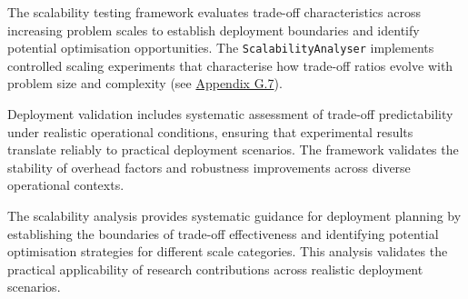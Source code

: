The scalability testing framework evaluates trade-off characteristics across increasing problem scales to establish deployment boundaries and identify potential optimisation opportunities. The \texttt{ScalabilityAnalyser} implements controlled scaling experiments that characterise how trade-off ratios evolve with problem size and complexity (see \hyperref[appendix:scalability-testing]{Appendix G.7}).

Deployment validation includes systematic assessment of trade-off predictability under realistic operational conditions, ensuring that experimental results translate reliably to practical deployment scenarios. The framework validates the stability of overhead factors and robustness improvements across diverse operational contexts.

The scalability analysis provides systematic guidance for deployment planning by establishing the boundaries of trade-off effectiveness and identifying potential optimisation strategies for different scale categories. This analysis validates the practical applicability of research contributions across realistic deployment scenarios.
